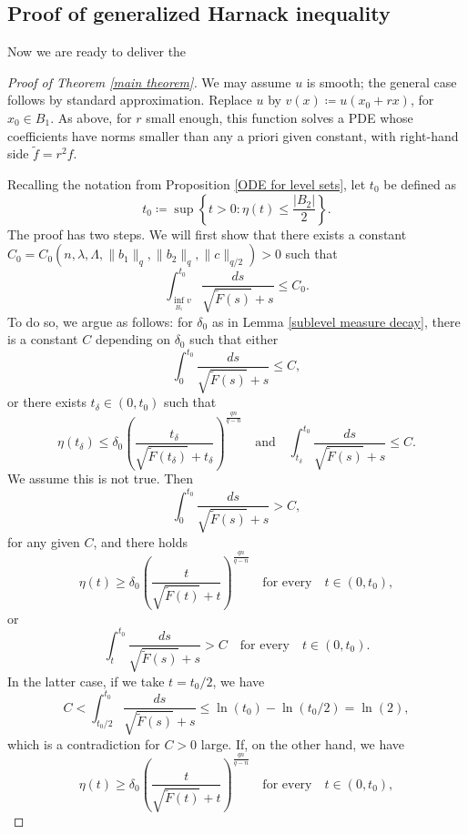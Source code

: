 \documentclass[12pt,a4paper]{amsart}
\numberwithin{equation}{section} %
\theoremstyle{definition}
\theoremstyle{remark}
\begin{document}
\subsection{Proof of generalized Harnack inequality}\label{main thm-subsct}

Now we are ready to deliver the

\begin{proof}[Proof of Theorem \ref{main theorem}]
We may assume $u$ is smooth; the general case follows by standard approximation. Replace $u$ by $v(x) \coloneqq u(x_0 + rx)$, for $x_0 \in B_1$. As above, for $r$ small enough, this function solves a PDE whose coefficients have norms smaller than any a priori given constant, with right-hand side $\tilde{f} = r^2 f$.

Recalling the notation from Proposition \ref{ODE for level sets}, let $t_0$ be defined as
$$
    t_0 \coloneqq \sup\left\{t>0 \colon \eta(t) \leq \frac{|B_2|}{2} \right\}.
$$
The proof has two steps. We will first show that there exists a constant $C_0 = C_0(n,\lambda,\Lambda,\|b_1\|_q,\|b_2\|_q,\|c\|_{q/2})>0$ such that
$$
    \int_{\inf_{B_1} v}^{t_0}\frac{ds}{\sqrt{\tilde{F}(s)}+s} \leq C_0.
$$
To do so, we argue as follows: for $\delta_0$ as in Lemma \ref{sublevel measure decay}, there is a constant $C$ depending on $\delta_0$ such that either
\begin{equation}\label{integral from zero to t0}
    \int_{0}^{t_0}\frac{ds}{\sqrt{\tilde{F}(s)}+s}\leq C,
\end{equation}
or there exists $t_\delta \in (0,t_0)$ such that
\begin{equation}\label{t small}
    \eta(t_\delta) \leq \delta_0 \left(\frac{t_\delta}{\sqrt{\tilde{F}(t_\delta)} + t_\delta} \right)^\frac{q n}{q-n} \quad \mbox{and} \quad \int_{t_\delta}^{t_0} \frac{ds}{\sqrt{\tilde{F}(s)}+s}\leq C.
\end{equation}
 We assume this is not true. Then
$$
    \int_{0}^{t_0}\frac{ds}{\sqrt{\tilde{F}(s)}+s} > C,
$$
for any given $C$, and there holds
$$
    \eta(t) \geq \delta_0 \left(\frac{t}{\sqrt{\tilde{F}(t)} + t} \right)^\frac{q n}{q-n} \quad \mbox{for every} \quad t \in (0,t_0),
$$
or
$$
    \int_{t}^{t_0} \frac{ds}{\sqrt{\tilde{F}(s)}+s} > C \quad \mbox{for every} \quad t \in (0,t_0).
$$
In the latter case, if we take $t = t_0/2$, we have
$$
    C < \int_{t_0/2}^{t_0} \frac{ds}{\sqrt{\tilde{F}(s)}+s} \leq \ln(t_0) - \ln(t_0/2) = \ln(2),
$$
which is a contradiction for $C>0$ large. If, on the other hand, we have
$$
    \eta(t) \geq \delta_0 \left(\frac{t}{\sqrt{\tilde{F}(t)} + t} \right)^\frac{q n}{q-n} \quad \mbox{for every} \quad t \in (0,t_0),
$$
\end{proof}
\end{document}
